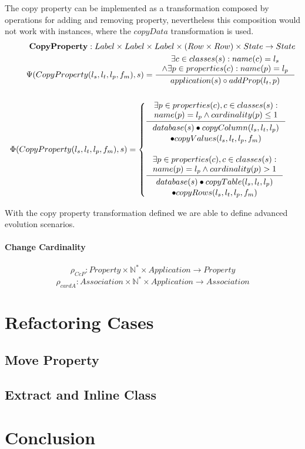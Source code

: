 \documentclass[11pt]{article}
\begin{document}
The copy property can be implemented as a transformation composed by operations for adding and removing property, nevertheless this composition would not work with instances, where the $copyData$ transformation is used.
\begin{align*}
	\mathbf{CopyProperty} : Label \times Label \times Label \times (Row \times Row) \times State \rightarrow State \\
	\Psi(CopyProperty(l_s, l_t, l_p, f_m), s) = \inference{\exists c \in classes(s) : name(c) = l_s \\ \wedge \exists p \in properties(c) : name(p) = l_p }{application(s) \circ addProp(l_t, p)} \\\\
	\Phi(CopyProperty(l_s, l_t, l_p, f_m), s) = \begin{cases}
		\inference{\exists p \in properties(c), c \in classes(s) : \\ name(p) = l_p \wedge cardinality(p) \leq 1 }{\begin{gathered}
			database(s) \bullet copyColumn(l_s, l_t, l_p) \\ \bullet copyValues(l_s, l_t, l_p, f_m) 
			\end{gathered}} \\ \\
		\inference{\exists p \in properties(c), c \in classes(s) : \\ name(p) = l_p \wedge cardinality(p) > 1}{\begin{gathered}
			database(s) \bullet copyTable(l_s, l_t, l_p) \\ \bullet copyRows(l_s, l_t, l_p, f_m) 
			\end{gathered}}
 \end{cases}
\end{align*}

With the copy property transformation defined we are able to define advanced evolution scenarios.

\paragraph{Change Cardinality}
$$\rho_{CcP} : Property \times \mathbb{N^{*}} \times Application \rightarrow Property $$
$$\rho_{cardA} : Association \times \mathbb{N^{*}} \times Application \rightarrow Association $$

\section{Refactoring Cases}
\subsection{Move Property}
\subsection{Extract and Inline Class}

\section{Conclusion}
\end{document}
